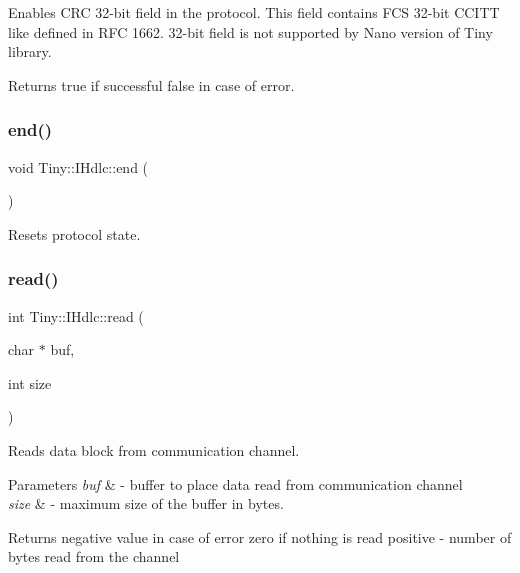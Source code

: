 Enables C\+RC 32-\/bit field in the protocol. This field contains F\+CS 32-\/bit C\+C\+I\+TT like defined in R\+FC 1662. 32-\/bit field is not supported by Nano version of Tiny library. \begin{DoxyReturn}{Returns}
true if successful false in case of error. 
\end{DoxyReturn}
\mbox{\label{classTiny_1_1IHdlc_aba569c97764fdd95e6f140ef51ea83f8}} 
\subsubsection{\texorpdfstring{end()}{end()}}
{\footnotesize\ttfamily void Tiny\+::\+I\+Hdlc\+::end (\begin{DoxyParamCaption}{ }\end{DoxyParamCaption})}

Resets protocol state. \mbox{\label{classTiny_1_1IHdlc_a54c9d5e5be794fa119d526578392825a}} 
\subsubsection{\texorpdfstring{read()}{read()}\hspace{0.1cm}{\footnotesize\ttfamily [1/2]}}
{\footnotesize\ttfamily int Tiny\+::\+I\+Hdlc\+::read (\begin{DoxyParamCaption}\item[{char $\ast$}]{buf,  }\item[{int}]{size }\end{DoxyParamCaption})}

Reads data block from communication channel. 
\begin{DoxyParams}{Parameters}
{\em buf} & -\/ buffer to place data read from communication channel \\
\hline
{\em size} & -\/ maximum size of the buffer in bytes. \\
\hline
\end{DoxyParams}
\begin{DoxyReturn}{Returns}
negative value in case of error zero if nothing is read positive -\/ number of bytes read from the channel 
\end{DoxyReturn}
\mbox{\label{classTiny_1_1IHdlc_a275940cd1c426e41b5201f011aa05723}} 
